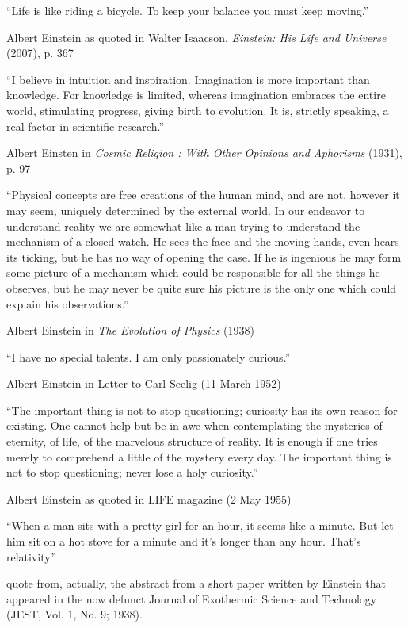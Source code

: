 

``Life is like riding a bicycle. To keep your balance you must keep moving.''

Albert Einstein as quoted in Walter Isaacson, \emph{Einstein: His Life and Universe} (2007), p. 367


``I believe in intuition and inspiration. Imagination is more important than knowledge. For knowledge is limited, whereas imagination embraces the entire world, stimulating progress, giving birth to evolution. It is, strictly speaking, a real factor in scientific research.''

Albert Einsten in \emph{Cosmic Religion : With Other Opinions and Aphorisms} (1931), p. 97


``Physical concepts are free creations of the human mind, and are not, however it may seem, uniquely determined by the external world. In our endeavor to understand reality we are somewhat like a man trying to understand the mechanism of a closed watch. He sees the face and the moving hands, even hears its ticking, but he has no way of opening the case. If he is ingenious he may form some picture of a mechanism which could be responsible for all the things he observes, but he may never be quite sure his picture is the only one which could explain his observations.''

Albert Einstein in \emph{The Evolution of Physics} (1938)


``I have no special talents. I am only passionately curious.''

Albert Einstein in Letter to Carl Seelig (11 March 1952)


``The important thing is not to stop questioning; curiosity has its own reason for existing. One cannot help but be in awe when contemplating the mysteries of eternity, of life, of the marvelous structure of reality. It is enough if one tries merely to comprehend a little of the mystery every day. The important thing is not to stop questioning; never lose a holy curiosity.''

Albert Einstein as quoted in LIFE magazine (2 May 1955)


``When a man sits with a pretty girl for an hour, it seems like a minute. But let him sit on a hot stove for a minute and it's longer than any hour. That's relativity.''

quote from, actually, the abstract from a short paper written by Einstein that appeared in the now defunct Journal of Exothermic Science and Technology (JEST, Vol. 1, No. 9; 1938).


